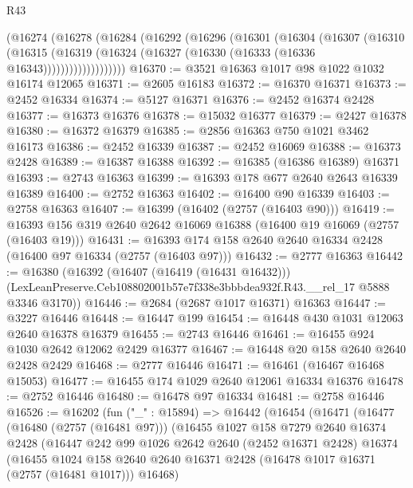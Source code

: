 \begin{lexlean}{R43}
\begin{coremodule}
          (@16274
            (@16278
              (@16284
                (@16292
                  (@16296
                    (@16301
                      (@16304
                        (@16307
                          (@16310
                            (@16315
                              (@16319
                                (@16324 (@16327 (@16330 (@16333 (@16336 @16343)))))))))))))))))))
@16370 := @3521 @16363 @1017 @98 @1022 @1032 @16174 @12065
@16371 := @2605 @16183
@16372 := @16370 @16371
@16373 := @2452 @16334
@16374 := @5127 @16371
@16376 := @2452 @16374 @2428
@16377 := @16373 @16376
@16378 := @15032 @16377
@16379 := @2427 @16378
@16380 := @16372 @16379
@16385 := @2856 @16363 @750 @1021 @3462 @16173
@16386 := @2452 @16339
@16387 := @2452 @16069
@16388 := @16373 @2428
@16389 := @16387 @16388
@16392 := @16385 (@16386 @16389) @16371
@16393 := @2743 @16363
@16399 := @16393 @178 @677 @2640 @2643 @16339 @16389
@16400 := @2752 @16363
@16402 := @16400 @90 @16339
@16403 := @2758 @16363
@16407 := @16399 (@16402 (@2757 (@16403 @90)))
@16419 := @16393 @156 @319 @2640 @2642 @16069 @16388 (@16400 @19 @16069 (@2757 (@16403 @19)))
@16431 := @16393 @174 @158 @2640 @2640 @16334 @2428 (@16400 @97 @16334 (@2757 (@16403 @97)))
@16432 := @2777 @16363
@16442 := @16380
    (@16392
      (@16407 (@16419 (@16431 @16432)))
      (LexLeanPreserve.Ceb108802001b57e7f338e3bbbdea932f.R43.__rel_17 @5888 @3346 @3170))
@16446 := @2684 (@2687 @1017 @16371) @16363
@16447 := @3227 @16446
@16448 := @16447 @199
@16454 := @16448 @430 @1031 @12063 @2640 @16378 @16379
@16455 := @2743 @16446
@16461 := @16455 @924 @1030 @2642 @12062 @2429 @16377
@16467 := @16448 @20 @158 @2640 @2640 @2428 @2429
@16468 := @2777 @16446
@16471 := @16461 (@16467 @16468 @15053)
@16477 := @16455 @174 @1029 @2640 @12061 @16334 @16376
@16478 := @2752 @16446
@16480 := @16478 @97 @16334
@16481 := @2758 @16446
@16526 := @16202
    (fun ("_" : @15894) =>
    @16442
      (@16454
        (@16471
          (@16477
            (@16480 (@2757 (@16481 @97)))
            (@16455
              @1027
              @158
              @7279
              @2640
              @16374
              @2428
              (@16447
                @242
                @99
                @1026
                @2642
                @2640
                (@2452 @16371 @2428)
                @16374
                (@16455
                  @1024
                  @158
                  @2640
                  @2640
                  @16371
                  @2428
                  (@16478 @1017 @16371 (@2757 (@16481 @1017)))
                  @16468)

\end{coremodule}
\end{lexlean}
